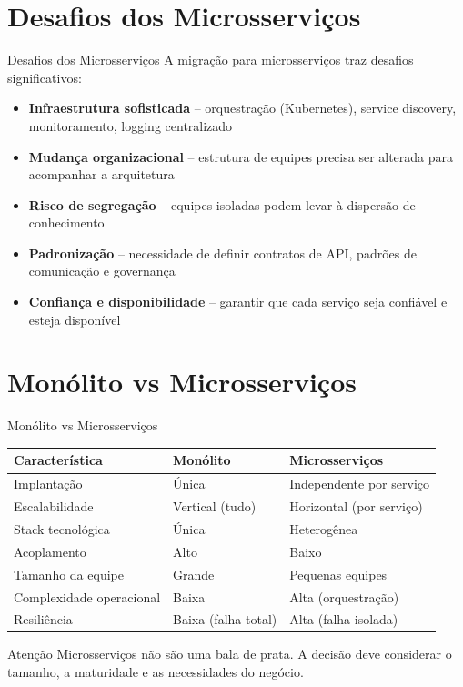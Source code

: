 \documentclass[aspectratio=169]{beamer}
\begin{document}
\section{Desafios dos Microsserviços}

\begin{frame}{Desafios dos Microsserviços}
    A migração para microsserviços traz desafios significativos:
    \vspace{0.3cm}
    \begin{itemize}
        \item \textbf{Infraestrutura sofisticada} -- orquestração (Kubernetes), service discovery, monitoramento, logging centralizado
        \item \textbf{Mudança organizacional} -- estrutura de equipes precisa ser alterada para acompanhar a arquitetura
        \item \textbf{Risco de segregação} -- equipes isoladas podem levar à dispersão de conhecimento
        \item \textbf{Padronização} -- necessidade de definir contratos de API, padrões de comunicação e governança
        \item \textbf{Confiança e disponibilidade} -- garantir que cada serviço seja confiável e esteja disponível
    \end{itemize}
\end{frame}

\section{Monólito vs Microsserviços}

\begin{frame}{Monólito vs Microsserviços}
    \centering
    \begin{tabular}{p{3.5cm}|p{3.5cm}|p{3.5cm}}
        \textbf{Característica} & \textbf{Monólito} & \textbf{Microsserviços} \\ \hline
        Implantação & Única & Independente por serviço \\
        Escalabilidade & Vertical (tudo) & Horizontal (por serviço) \\
        Stack tecnológica & Única & Heterogênea \\
        Acoplamento & Alto & Baixo \\
        Tamanho da equipe & Grande & Pequenas equipes \\
        Complexidade operacional & Baixa & Alta (orquestração) \\
        Resiliência & Baixa (falha total) & Alta (falha isolada) \\
    \end{tabular}
    \vspace{0.4cm}
    \begin{alertblock}{Atenção}
        Microsserviços não são uma bala de prata. A decisão deve considerar o tamanho, a maturidade e as necessidades do negócio.
    \end{alertblock}
\end{frame}
\end{document}
